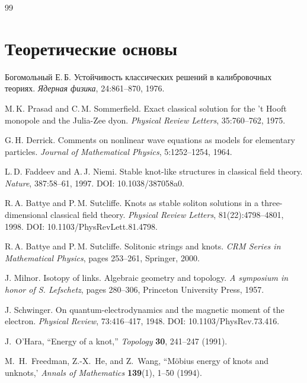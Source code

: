 \documentclass[11pt,a4paper]{article}
\begin{document}
\begin{thebibliography}{99}
	
	\section*{Теоретические основы}
	
	Богомольный Е.\,Б.
	\newblock Устойчивость классических решений в калибровочных теориях.
	\newblock \textit{Ядерная физика}, 24:861--870, 1976.
	
	M.\,K. Prasad and C.\,M. Sommerfield.
	\newblock Exact classical solution for the 't Hooft monopole and the Julia-Zee dyon.
	\newblock \textit{Physical Review Letters}, 35:760--762, 1975.
	
	G.\,H. Derrick.
	\newblock Comments on nonlinear wave equations as models for elementary particles.
	\newblock \textit{Journal of Mathematical Physics}, 5:1252--1254, 1964.
	
	L.\,D. Faddeev and A.\,J. Niemi.
	\newblock Stable knot-like structures in classical field theory.
	\newblock \textit{Nature}, 387:58--61, 1997.
	\newblock DOI: 10.1038/387058a0.
	
	R.\,A. Battye and P.\,M. Sutcliffe.
	\newblock Knots as stable soliton solutions in a three-dimensional classical field theory.
	\newblock \textit{Physical Review Letters}, 81(22):4798--4801, 1998.
	\newblock DOI: 10.1103/PhysRevLett.81.4798.
	
	R.\,A. Battye and P.\,M. Sutcliffe.
	\newblock Solitonic strings and knots.
	\newblock \textit{CRM Series in Mathematical Physics}, pages 253--261, Springer, 2000.
	
	J. Milnor.
	\newblock Isotopy of links. Algebraic geometry and topology.
	\newblock \textit{A symposium in honor of S. Lefschetz}, pages 280--306, Princeton University Press, 1957.
	
	J. Schwinger.
	\newblock On quantum-electrodynamics and the magnetic moment of the electron.
	\newblock \textit{Physical Review}, 73:416--417, 1948.
	\newblock DOI: 10.1103/PhysRev.73.416.
	
	 J.~O'Hara, ``Energy of a knot,''
	\textit{Topology}
	\textbf{30}, 241--247 (1991).

	 M.~H.~Freedman, Z.-X.~He, and Z.~Wang, ``Möbius energy of knots and unknots,'
	\textit{Annals of Mathematics}
	\textbf{139}(1), 1--50 (1994).


\end{thebibliography}
\end{document}
